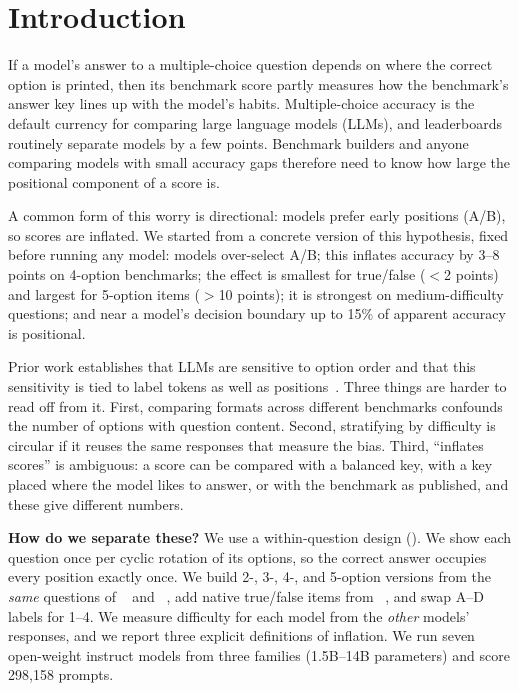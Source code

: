\section{Introduction}
\label{sec:intro}

If a model's answer to a multiple-choice question depends on where the correct option is printed, then its benchmark score partly measures how the benchmark's answer key lines up with the model's habits.
Multiple-choice accuracy is the default currency for comparing large language models (LLMs), and leaderboards routinely separate models by a few points.
Benchmark builders and anyone comparing models with small accuracy gaps therefore need to know how large the positional component of a score is.

A common form of this worry is directional: models prefer early positions (A/B), so scores are inflated.
We started from a concrete version of this hypothesis, fixed before running any model: models over-select A/B; this inflates accuracy by 3--8 points on 4-option benchmarks; the effect is smallest for true/false ($<$2 points) and largest for 5-option items ($>$10 points); it is strongest on medium-difficulty questions; and near a model's decision boundary up to 15\% of apparent accuracy is positional.

Prior work establishes that LLMs are sensitive to option order and that this sensitivity is tied to label tokens as well as positions~\citep{zheng2024selectors,pezeshkpour2024order,robinson2023mcqa}.
Three things are harder to read off from it.
First, comparing formats across different benchmarks confounds the number of options with question content.
Second, stratifying by difficulty is circular if it reuses the same responses that measure the bias.
Third, ``inflates scores'' is ambiguous: a score can be compared with a balanced key, with a key placed where the model likes to answer, or with the benchmark as published, and these give different numbers.

{\bf How do we separate these?}
We use a within-question design ().
We show each question once per cyclic rotation of its options, so the correct answer occupies every position exactly once.
We build 2-, 3-, 4-, and 5-option versions from the \emph{same} questions of \mmlu~\citep{hendrycks2021mmlu} and \csqa~\citep{talmor2019commonsenseqa}, add native true/false items from \boolq~\citep{clark2019boolq}, and swap A--D labels for 1--4.
We measure difficulty for each model from the \emph{other} models' responses, and we report three explicit definitions of inflation.
We run seven open-weight instruct models from three families (1.5B--14B parameters) and score 298{,}158 prompts.

